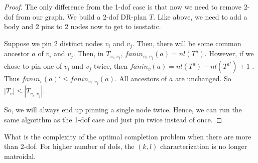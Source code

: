 \begin{proof}
    The only difference from the 1-dof case is that now we need to remove 2-dof from our graph. We build a 2-dof DR-plan $T$. Like above, we need to add a body and 2 pins to 2 nodes now to get to isostatic.

    Suppose we pin 2 distinct nodes $v_i$ and $v_j$. Then, there will be some common ancestor $a$ of $v_i$ and $v_j$. Then, in $T_{v_i,v_j}$, $fanin_{v_i,v_j}(a) = nl(T^a)$. However, if we chose to pin one of $v_i$ and $v_j$ twice, then $fanin_v(a) = nl(T^a) - nl(T^{a'}) +1$ . Thus $fanin_v(a)' \leq fanin_{v_i,v_j}(a)$. All ancestors of $a$ are unchanged. So $|T_v| \leq |T_{v_i,v_j}|$.

    So, we will always end up pinning a single node twice. Hence, we can run the same algorithm as the 1-dof case and just pin twice instead of once.
\end{proof}



\begin{openproblem}
    What is the complexity of the optimal completion problem when there are more than 2-dof. For higher number of dofs, the $(k,l)$ characterization is no longer matroidal.
\end{openproblem}
